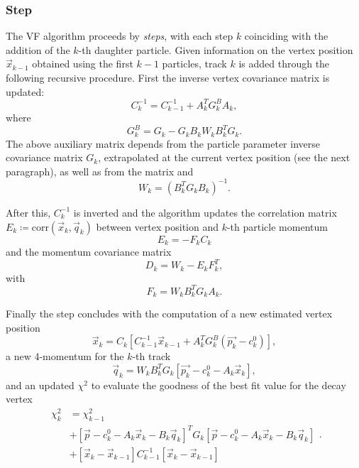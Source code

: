 \subsubsection{Step}

The VF algorithm proceeds by \textit{steps}, with each step $k$ coinciding with the addition of the $k$-th daughter particle.
Given information on the vertex position $\vec{x}_{k-1}$ obtained using the first $k-1$ particles, track $k$ is added through the following recursive procedure.
First the inverse vertex covariance matrix is updated:
\begin{equation}
C_k^{-1} = C_{k-1}^{-1} + A_k^T G_k^B A_k,
\end{equation}
where
\begin{equation}
G_k^B = G_k - G_k B_k W_k B_k^T G_k.
\end{equation}
The above auxiliary matrix depends from the particle parameter inverse covariance matrix $G_k$, extrapolated at the current vertex position (see the next paragraph), as well as from the matrix
and
\begin{equation}
W_k = {\left(B_k^T G_k B_k\right)}^{-1}.
\end{equation}

After this, $C_k^{-1}$ is inverted and the algorithm updates the correlation matrix $E_k \coloneqq \text{corr}(\vec{x}_{k},\vec{q}_k)$ between vertex position and $k$-th particle momentum
\begin{equation}
E_k = -F_k C_k
\end{equation}
and the momentum covariance matrix
\begin{equation}
D_k = W_k - E_k F_k^T,
\end{equation}
with
\begin{equation}
F_k = W_k B_k^T G_k A_k.
\end{equation}

Finally the step concludes with the computation of a new estimated vertex position
\begin{equation}
\vec{x}_k = C_k \left[
	C_{k-1}^{-1} \vec{x}_{k-1}
	+
	A_k^T G_k^B \left(
		\vec{p_k} - c_k^0	
	\right)
\right],
\end{equation}
a new 4-momentum for the $k$-th track
\begin{equation}
\vec{q}_k = W_k B_k^T G_k \left[
	\vec{p_k} - c_k^0 - A_k \vec{x}_k
\right],
\end{equation}
and an updated $\chi^2$ to evaluate the goodness of the best fit value for the decay vertex
\begin{equation}
\begin{aligned}
\chi^2_k &= \chi^2_{k-1} \\
&+
\left[
	\vec{p} - c_k^0 - A_k \vec{x}_k - B_k\vec{q}_k
\right]^T G_k \left[
	\vec{p} - c_k^0 - A_k \vec{x}_k - B_k\vec{q}_k
\right] \\
&+
\left[
	\vec{x}_k - \vec{x}_{k-1}
\right] C_{k-1}^{-1} \left[
	\vec{x}_k - \vec{x}_{k-1}
\right]
\end{aligned}.
\end{equation}

